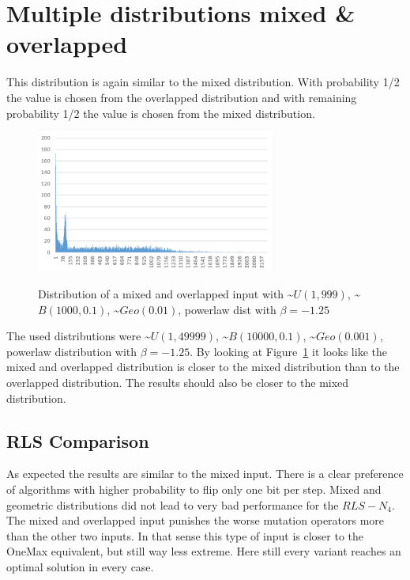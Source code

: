 \section{Multiple distributions mixed \& overlapped}
This distribution is again similar to the mixed distribution.
With probability 1/2 the value is chosen from the overlapped distribution and with remaining probability 1/2 the value is chosen from the mixed distribution.

\begin{figure}[h]
      \caption{Distribution of a mixed and overlapped input with \textasciitilde$U(1,999)$, \textasciitilde$B(1000,0.1)$, \textasciitilde$Geo(0.01)$, powerlaw dist with $\beta=-1.25$}
      \centering
      \includegraphics[width=0.7\textwidth]{figures/images/numberGenerator/mixedAndOverlapped.png}\label{fig:mixAndOverlDistExample}
\end{figure}

The used distributions were \textasciitilde$U(1,49999)$, \textasciitilde$B(10000,0.1)$, \textasciitilde$Geo(0.001)$, powerlaw distribution with $\beta=-1.25$.
By looking at Figure~\ref{fig:mixAndOverlDistExample} it looks like the mixed and overlapped distribution is closer to the mixed distribution than to the overlapped distribution.
The results should also be closer to the mixed distribution.
\subsection{RLS Comparison}




As expected the results are similar to the mixed input.
There is a clear preference of algorithms with higher probability to flip only one bit per step.
Mixed and geometric distributions did not lead to very bad performance for the $RLS-N_4$.
The mixed and overlapped input punishes the worse mutation operators more than the other two inputs.
In that sense this type of input is closer to the OneMax equivalent, but still way less extreme.
Here still every variant reaches an optimal solution in every case.
